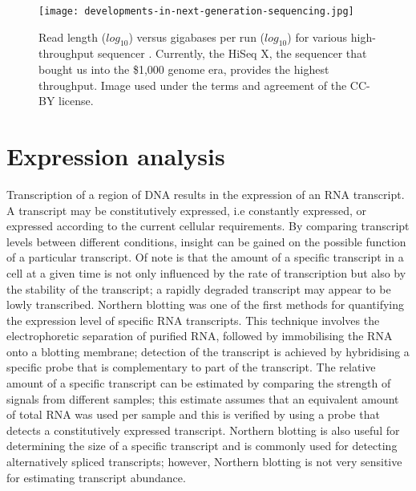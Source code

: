 \begin{figure}[!ht]
   \centering
   \texttt{[image: developments-in-next-generation-sequencing.jpg]}
   \caption[Developments in next generation sequencing]{Read length ($ log_{10} $) versus gigabases per run ($ log_{10} $) for various high-throughput sequencer \citep{Nederbragt2012}. Currently, the HiSeq X, the sequencer that bought us into the \$1,000 genome era, provides the highest throughput. Image used under the terms and agreement of the CC-BY license.}
   \label{fig:dev_next_gen}
\end{figure}

\section{Expression analysis}

Transcription of a region of DNA results in the expression of an RNA transcript. A transcript may be constitutively expressed, i.e constantly expressed, or expressed according to the current cellular requirements. By comparing transcript levels between different conditions, insight can be gained on the possible function of a particular transcript. Of note is that the amount of a specific transcript in a cell at a given time is not only influenced by the rate of transcription but also by the stability of the transcript; a rapidly degraded transcript may appear to be lowly transcribed. Northern blotting \citep{pmid414220} was one of the first methods for quantifying the expression level of specific RNA transcripts. This technique involves the electrophoretic separation of purified RNA, followed by immobilising the RNA onto a blotting membrane; detection of the transcript is achieved by hybridising a specific probe that is complementary to part of the transcript. The relative amount of a specific transcript can be estimated by comparing the strength of signals from different samples; this estimate assumes that an equivalent amount of total RNA was used per sample and this is verified by using a probe that detects a constitutively expressed transcript. Northern blotting is also useful for determining the size of a specific transcript and is commonly used for detecting alternatively spliced transcripts; however, Northern blotting is not very sensitive for estimating transcript abundance.

